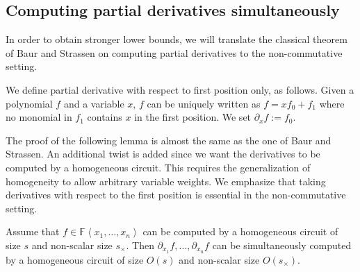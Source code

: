 \documentclass[10pt,a4paper]{article}
\def\Field{\mathbb{F}}
\let\F\Field
\def\inangle#1{\left\langle #1 \right\rangle}
\begin{document}
\subsection{Computing partial derivatives simultaneously}\label{sec:nd}

In order to obtain stronger lower bounds, we will translate the 
classical theorem of Baur and Strassen \cite{BS83} on computing partial derivatives to the non-commutative setting. 

We define partial derivative with respect to first position only, as follows. Given a polynomial $f$ and a variable $x$, $f$ can be uniquely written as $f=xf_0+f_1$ where no monomial in $f_1$ contains $x$ in the first position. 
We set $\partial_xf := f_0$. 

The proof of the following lemma is almost the same as the one of Baur and Strassen. An additional twist is added since we want the derivatives to be computed by a homogeneous circuit. 
This requires the generalization of homogeneity to allow arbitrary variable weights.
We emphasize that taking derivatives with respect to the first position is essential in the non-commutative setting. 

  
\begin{lemma}\label{lem:computing-partials-simultaneously}
  Assume that $f \in \F\inangle{x_1, \ldots, x_n}$ can be computed by a homogeneous circuit of size $s$ and non-scalar size $s_{\times}$. 
  Then $\partial_{ x_1}f, \ldots, \partial_{x_n}f$ can be simultaneously computed by a homogeneous circuit of size $O(s)$ and non-scalar size $O(s_\times)$.
\end{lemma}
\end{document}
